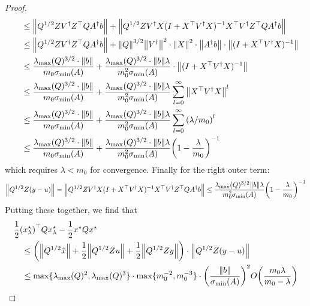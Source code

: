 \documentclass[12pt]{article}
\begin{document}
\begin{proof}
\begin{align*}
      &\quad\leq {\left\lVert Q^{1/2} Z V ^\dagger Z^\top Q A^\dagger b\right\rVert}
        + {\left\lVert Q^{1/2} Z V^\dagger X
          (I + X^\top V^\dagger X)^{-1} X^\top V^\dagger
          Z^\top Q A^\dagger b\right\rVert} \\
      &\quad\leq {\left\lVert Q^{1/2} Z V ^\dagger Z^\top Q A^\dagger b\right\rVert}
        + {\left\lVert Q\right\rVert}^{3/2} {\left\lVert V^\dagger\right\rVert}^2 \cdot {\left\lVert X\right\rVert}^2
          \cdot {\left\lVert A^\dagger b\right\rVert}
          \cdot {\left\lVert(I + X^\top V^\dagger X)^{-1}\right\rVert} \\
      &\quad\leq
        \frac{\lambda_{\max} (Q)^{3/2} \cdot {\left\lVert b\right\rVert}}{m_0 \sigma_{\min} (A)}
        + \frac{\lambda_{\max} (Q)^{3/2} \cdot {\left\lVert b\right\rVert} \lambda}
                {m_0 ^2 \sigma_{\min} (A)}
        \cdot {\left\lVert(I + X^\top V^\dagger X)^{-1}\right\rVert} \\
      &\quad\leq
        \frac{\lambda_{\max} (Q)^{3/2} \cdot {\left\lVert b\right\rVert}}{m_0 \sigma_{\min} (A)}
        + \frac{\lambda_{\max} (Q)^{3/2} \cdot {\left\lVert b\right\rVert} \lambda}
                {m_0 ^2 \sigma_{\min} (A)}
          \sum_{l = 0}^{\infty} {\left\lVert X^\top V^\dagger X\right\rVert}^l \\
      &\quad\leq
        \frac{\lambda_{\max} (Q)^{3/2} \cdot {\left\lVert b\right\rVert}}{m_0 \sigma_{\min} (A)}
        + \frac{\lambda_{\max} (Q)^{3/2} \cdot {\left\lVert b\right\rVert} \lambda}
                {m_0 ^2 \sigma_{\min} (A)}
          \sum_{l = 0}^{\infty} {\left(\lambda / m_0\right)}^l \\
      &\quad\leq
        \frac{\lambda_{\max} (Q)^{3/2} \cdot {\left\lVert b\right\rVert}}{m_0 \sigma_{\min} (A)}
        + \frac{\lambda_{\max} (Q)^{3/2} \cdot {\left\lVert b\right\rVert} \lambda}
                {m_0 ^2 \sigma_{\min} (A)}
            {\left(1 - \frac{\lambda}{m_0}\right)}^{-1}
  \end{align*}
  which requires \(\lambda < m_0\) for convergence.
  Finally for the right outer term:
  \begin{align*}
    {\left\lVert Q^{1/2} Z (y - u)\right\rVert}
      = {\left\lVert Q^{1/2} Z V^\dagger X
        (I + X^\top V^\dagger X)^{-1} X^\top V^\dagger Z^\top Q A ^\dagger b\right\rVert}
      \leq \frac{\lambda_{\max} (Q)^{3/2} {\left\lVert b\right\rVert} \lambda}{m_0 ^2 \sigma_{\min} (A)}
      {\left(1 - \frac{\lambda}{m_0}\right)}^{-1}
  \end{align*}
  Putting these together, we find that
  \begin{align*}
    &\frac{1}{2} {\left(x_\lambda ^\star\right)}^\top Q x_\lambda ^\star
      - \frac{1}{2} x^\star Q x^\star \\
    &\quad\leq
      {\left({\left\lVert Q^{1/2} \hat{x}\right\rVert}
        + \frac{1}{2} {\left\lVert Q^{1/2} Z u\right\rVert}
        + \frac{1}{2} {\left\lVert Q^{1/2} Z y\right\rVert}\right)}
            \cdot {\left\lVert Q^{1/2} Z (y - u)\right\rVert} \\
    &\quad \leq
      \max\{\lambda_{\max} (Q)^2, \lambda_{\max} (Q)^3\}
       \cdot \max\{m_0 ^{-2}, m_0 ^{-3}\}
       \cdot {\left(\frac{{\left\lVert b\right\rVert}}{\sigma_{\min} (A)}\right)}^2
       O {\left(\frac{m_0 \lambda}{m_0 - \lambda}\right)}
  \end{align*}

\end{proof}



\printbibliography
\end{document}

